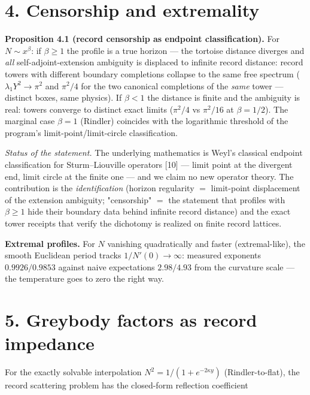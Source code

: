 \documentclass[11pt]{article}
\begin{document}
\section*{4. Censorship and extremality}
\textbf{Proposition 4.1 (record censorship as endpoint classification).} For $N \sim x^\beta$: if $\beta \ge 1$ the profile is a true horizon — the tortoise distance diverges and \emph{all} self-adjoint-extension ambiguity is displaced to infinite record distance: record towers with different boundary completions collapse to the same free spectrum ($\lambda_1 Y^2 \to \pi^2$ and $\pi^2/4$ for the two canonical completions of the \emph{same} tower — distinct boxes, same physics).  If $\beta < 1$ the distance is finite and the ambiguity is real: towers converge to distinct exact limits ($\pi^2/4$ vs $\pi^2/16$ at $\beta = 1/2$).  The marginal case $\beta = 1$ (Rindler) coincides with the logarithmic threshold of the program's limit-point/limit-circle classification.

\emph{Status of the statement.}  The underlying mathematics is Weyl's classical endpoint classification for Sturm–Liouville operators [10] — limit point at the divergent end, limit circle at the finite one — and we claim no new operator theory.  The contribution is the \emph{identification} (horizon regularity $=$ limit-point displacement of the extension ambiguity; "censorship" $=$ the statement that profiles with $\beta \ge 1$ hide their boundary data behind infinite record distance) and the exact tower receipts that verify the dichotomy is realized on finite record lattices.

\textbf{Extremal profiles.}  For $N$ vanishing quadratically and faster (extremal-like), the smooth Euclidean period tracks $1/N'(0) \to \infty$: measured exponents $0.9926/0.9853$ against naive expectations $2.98/4.93$ from the curvature scale — the temperature goes to zero the right way.

\section*{5. Greybody factors as record impedance}
For the exactly solvable interpolation $N^2 = 1/(1 + e^{-2\kappa y})$ (Rindler-to-flat), the record scattering problem has the closed-form reflection coefficient
\end{document}
